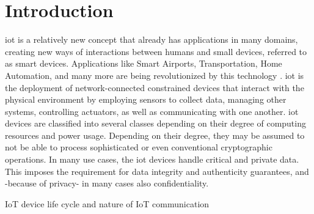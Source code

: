 \chapter{Introduction}
\label{ch:introduction}

\gls{iot} is a relatively new concept that already has applications in many domains, creating new ways of interactions between humans and small devices, referred to as smart devices. Applications like Smart Airports, Transportation, Home Automation, and many more are being revolutionized by this technology \cite{marksteiner2017overview}.
\gls{iot} is the deployment of network-connected constrained devices that interact with the physical environment by employing sensors to collect data, managing other systems, controlling actuators, as well as communicating with one another. \gls{iot} devices are classified into several classes depending on their degree of computing resources and power usage. Depending on their degree, they may be assumed to not be able to process sophisticated or even conventional cryptographic operations. In many use cases, the \gls{iot} devices handle critical and private data. This imposes the requirement for data integrity and authenticity guarantees, and -because of privacy- in many cases also confidentiality.
\par
IoT device life cycle and nature of IoT communication 


